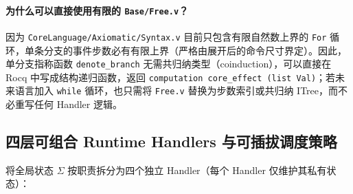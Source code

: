 \documentclass[UTF8,a4paper,11pt,fontset=fandol]{ctexart}
\newcommand{\code}[1]{\texttt{#1}}
\begin{document}
\paragraph{为什么可以直接使用有限的 \code{Base/Free.v}？}
因为 \code{CoreLanguage/Axiomatic/Syntax.v} 目前只包含有限自然数上界的 \code{For} 循环，单条分支的事件步数必有有限上界（严格由展开后的命令尺寸界定）。因此，单分支指称函数 \code{denote\_branch} 无需共归纳类型（coinduction），可以直接在 Rocq 中写成结构递归函数，返回 \code{computation core\_effect (list Val)}；若未来语言加入 \code{while} 循环，也只需将 \code{Free.v} 替换为步数索引或共归纳 ITree，而不必重写任何 Handler 逻辑。

\subsection{四层可组合 Runtime Handlers 与可插拔调度策略}

将全局状态 $\Sigma$ 按职责拆分为四个独立 Handler（每个 Handler 仅维护其私有状态）：
\end{document}
